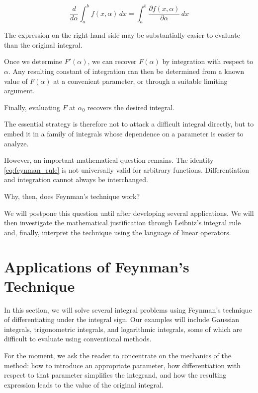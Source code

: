 \documentclass[11pt,a4paper]{article}
\theoremstyle{definition}
\theoremstyle{remark}
\begin{document}
\begin{equation}
    \boxed{
    \frac{d}{d\alpha}
    \int_a^b f(x,\alpha)\,dx
    =
    \int_a^b
    \frac{\partial f(x,\alpha)}
         {\partial\alpha}\,dx
    }
    \label{eq:feynman_rule}
\end{equation}

The expression on the right-hand side may
be substantially easier to evaluate than
the original integral.

Once we determine $F'(\alpha)$, we can
recover $F(\alpha)$ by integration with
respect to $\alpha$. Any resulting
constant of integration can then be
determined from a known value of
$F(\alpha)$ at a convenient parameter,
or through a suitable limiting argument.

Finally, evaluating $F$ at $\alpha_0$
recovers the desired integral.

The essential strategy is therefore not
to attack a difficult integral directly,
but to embed it in a family of integrals
whose dependence on a parameter is
easier to analyze.

\medskip

However, an important mathematical question
remains. The identity \eqref{eq:feynman_rule}
is not universally valid for arbitrary
functions. Differentiation and integration
cannot always be interchanged.

Why, then, does Feynman's technique work?

We will postpone this question until
after developing several applications.
We will then investigate the
mathematical justification through
Leibniz's integral rule and, finally,
interpret the technique using the
language of linear operators.



\section{Applications of Feynman's Technique}

In this section, we will solve several
integral problems using Feynman's technique
of differentiating under the integral sign.
Our examples will include Gaussian integrals,
trigonometric integrals, and logarithmic
integrals, some of which are difficult
to evaluate using conventional methods.

For the moment, we ask the reader to
concentrate on the mechanics of the method:
how to introduce an appropriate parameter,
how differentiation with respect to that
parameter simplifies the integrand, and
how the resulting expression leads to
the value of the original integral.
\end{document}

